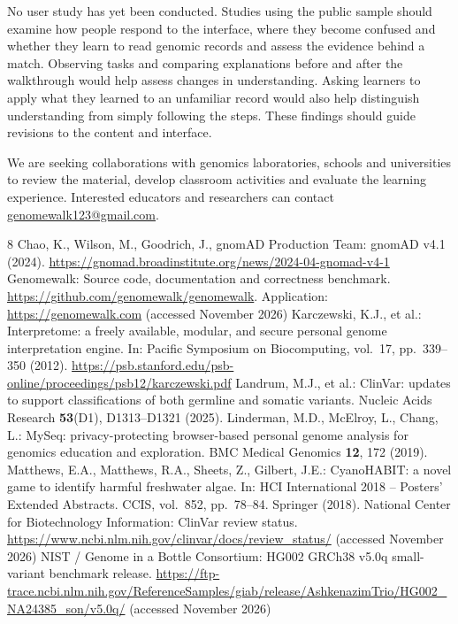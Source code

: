 \documentclass[runningheads]{llncs}
\begin{document}
No user study has yet been conducted. Studies using the public sample should examine how people respond to the interface, where they become confused and whether they learn to read genomic records and assess the evidence behind a match. Observing tasks and comparing explanations before and after the walkthrough would help assess changes in understanding. Asking learners to apply what they learned to an unfamiliar record would also help distinguish understanding from simply following the steps. These findings should guide revisions to the content and interface.

We are seeking collaborations with genomics laboratories, schools and universities to review the material, develop classroom activities and evaluate the learning experience. Interested educators and researchers can contact \mbox{\href{mailto:genomewalk123@gmail.com}{genomewalk123@gmail.com}}.

\begin{thebibliography}{8}
Chao, K., Wilson, M., Goodrich, J., gnomAD Production Team: gnomAD v4.1 (2024). \url{https://gnomad.broadinstitute.org/news/2024-04-gnomad-v4-1}
Genomewalk: Source code, documentation and correctness benchmark. \url{https://github.com/genomewalk/genomewalk}. Application: \url{https://genomewalk.com} (accessed November 2026)
Karczewski, K.J., et al.: Interpretome: a freely available, modular, and secure personal genome interpretation engine. In: Pacific Symposium on Biocomputing, vol.~17, pp.~339--350 (2012). \url{https://psb.stanford.edu/psb-online/proceedings/psb12/karczewski.pdf}
Landrum, M.J., et al.: ClinVar: updates to support classifications of both germline and somatic variants. Nucleic Acids Research \textbf{53}(D1), D1313--D1321 (2025). 
Linderman, M.D., McElroy, L., Chang, L.: MySeq: privacy-protecting browser-based personal genome analysis for genomics education and exploration. BMC Medical Genomics \textbf{12}, 172 (2019). 
Matthews, E.A., Matthews, R.A., Sheets, Z., Gilbert, J.E.: CyanoHABIT: a novel game to identify harmful freshwater algae. In: HCI International 2018 -- Posters' Extended Abstracts. CCIS, vol.~852, pp.~78--84. Springer (2018). 
National Center for Biotechnology Information: ClinVar review status. \url{https://www.ncbi.nlm.nih.gov/clinvar/docs/review_status/} (accessed November 2026)
NIST / Genome in a Bottle Consortium: HG002 GRCh38 v5.0q small-variant benchmark release. \url{https://ftp-trace.ncbi.nlm.nih.gov/ReferenceSamples/giab/release/AshkenazimTrio/HG002_NA24385_son/v5.0q/} (accessed November 2026)
\end{thebibliography}
\end{document}
